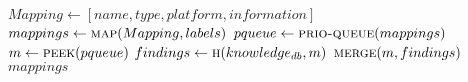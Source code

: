 \begin{algorithmic}[1]
    \State $Mapping \gets [name, type, platform, information]$
    \State $mappings \gets \Call{map}{Mapping, labels}$
    \State $pqueue \gets \Call{prio-queue}{mappings}$
    \State $m \gets \Call{peek}{pqueue}$
    \State $findings \gets \Call{h}{knowledge_{db}, m}$
    \State $\Call{merge}{m, findings}$
    \EndFor
    \State {}
    \Else
    \State {}
    \EndIf
    \EndWhile
    \State \Return $mappings$
    \EndFunction
\end{algorithmic}
